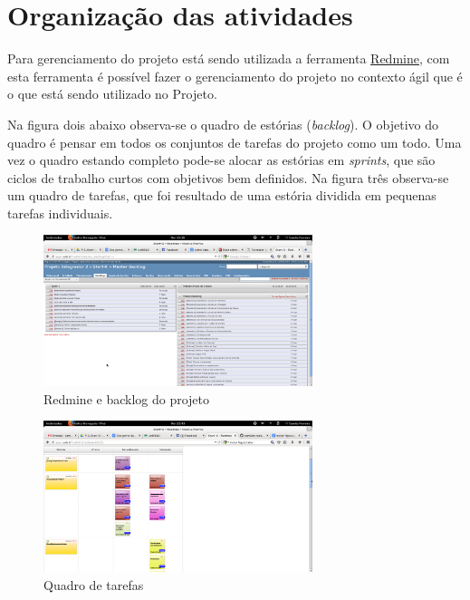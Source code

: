 \chapter[Organização das atividades]{Organização das atividades}
Para gerenciamento do projeto está sendo utilizada a ferramenta \href{http://lappis.unb.br/redm}{Redmine}, com esta ferramenta é possível fazer o gerenciamento do projeto no contexto ágil que é o que está sendo utilizado no Projeto.

Na figura dois abaixo observa-se o quadro de estórias (\textit{backlog}). O objetivo do quadro é pensar em todos os conjuntos de tarefas do projeto como um todo. Uma vez o quadro estando completo pode-se alocar as estórias em \textit{sprints}, que são ciclos de trabalho curtos com objetivos bem definidos. Na figura três observa-se um quadro de tarefas, que foi resultado de uma estória dividida em pequenas tarefas individuais.

\begin{figure}[h]
  \centering
  \includegraphics[width=0.7\textwidth]
      {figuras/backlogs.eps}
  \caption{Redmine e backlog do projeto}
  \label{redmine-backlog}
\end{figure}

\begin{figure}[h]
  \centering
  \includegraphics[width=0.7\textwidth]
      {figuras/quadrotarefas.eps}
  \caption{Quadro de tarefas}
  \label{quadro-de-tarefas}
\end{figure}
\newpage


